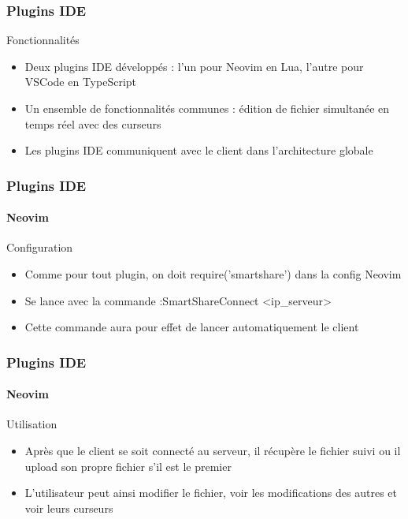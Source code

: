 \documentclass{beamer}
\begin{document}
\begin{frame}
    \frametitle{Plugins IDE}
    \begin{block}{Fonctionnalités}
        \begin{itemize}
            \item Deux plugins IDE développés : l'un pour Neovim en Lua, l'autre pour VSCode en TypeScript
            \item Un ensemble de fonctionnalités communes : édition de fichier simultanée en temps réel avec des curseurs
            \item Les plugins IDE communiquent avec le client dans l'architecture globale
        \end{itemize}
    \end{block}
\end{frame}

\begin{frame}
    \frametitle{Plugins IDE}
    \framesubtitle{Neovim}
    \begin{block}{Configuration}
        \begin{itemize}
            \item Comme pour tout plugin, on doit require('smartshare') dans la config Neovim
            \item Se lance avec la commande :SmartShareConnect <ip\_serveur>
            \item Cette commande aura pour effet de lancer automatiquement le client
        \end{itemize}
    \end{block}
\end{frame}

\begin{frame}
    \frametitle{Plugins IDE}
    \framesubtitle{Neovim}
    \begin{block}{Utilisation}
        \begin{itemize}
            \item Après que le client se soit connecté au serveur, il récupère le fichier suivi ou il upload son propre fichier s'il est le premier
            \item L'utilisateur peut ainsi modifier le fichier, voir les modifications des autres et voir leurs curseurs
        \end{itemize}
    \end{block}
\end{frame}
\end{document}
